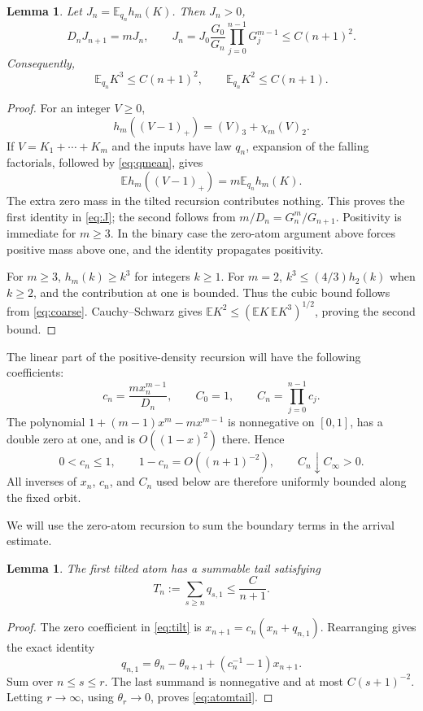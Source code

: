 \documentclass[11pt,letterpaper,reqno]{amsart}
\theoremstyle{plain}
\newtheorem{lemma}[theorem]{Lemma}
\newcommand{\E}{\mathbb E}\newcommand{\Pp}{\mathbb P}
\begin{document}
\begin{lemma}\label{lem:cubic}
Let $J_n=\E_{q_n}h_m(K)$. Then $J_n>0$,
\begin{equation}\label{eq:J}
 D_nJ_{n+1}=mJ_n,\qquad
 J_n=J_0\frac{G_0}{G_n}\prod_{j=0}^{n-1}G_j^{m-1}\le C(n+1)^2.
\end{equation}
Consequently,
\begin{equation}\label{eq:lowmoments}
 \E_{q_n}K^3\le C(n+1)^2,\qquad
 \E_{q_n}K^2\le C(n+1).
\end{equation}
\end{lemma}
\begin{proof}
For an integer $V\ge0$,
\[
 h_m((V-1)_+)=(V)_3+\chi_m(V)_2.
\]
If $V=K_1+\cdots+K_m$ and the inputs have law $q_n$, expansion of the falling factorials, followed by \eqref{eq:qmean}, gives
\[
 \E h_m((V-1)_+)=m\E_{q_n}h_m(K).
\]
The extra zero mass in the tilted recursion contributes nothing. This proves the first identity in \eqref{eq:J}; the second follows from $m/D_n=G_n^m/G_{n+1}$. Positivity is immediate for $m\ge3$. In the binary case the zero-atom argument above forces positive mass above one, and the identity propagates positivity.

For $m\ge3$, $h_m(k)\ge k^3$ for integers $k\ge1$. For $m=2$, $k^3\le(4/3)h_2(k)$ when $k\ge2$, and the contribution at one is bounded. Thus the cubic bound follows from \eqref{eq:coarse}. Cauchy--Schwarz gives $\E K^2\le(\E K\,\E K^3)^{1/2}$, proving the second bound.
\end{proof}

The linear part of the positive-density recursion will have the following coefficients:
\begin{equation}\label{eq:c}
 c_n=\frac{mx_n^{m-1}}{D_n},\qquad C_0=1,\qquad C_n=\prod_{j=0}^{n-1}c_j.
\end{equation}
The polynomial $1+(m-1)x^m-mx^{m-1}$ is nonnegative on $[0,1]$, has a double zero at one, and is $O((1-x)^2)$ there. Hence
\begin{equation}\label{eq:C}
 0<c_n\le1,\qquad 1-c_n=O((n+1)^{-2}),\qquad
 C_n\downarrow C_\infty>0.
\end{equation}
All inverses of $x_n$, $c_n$, and $C_n$ used below are therefore uniformly bounded along the fixed orbit.

We will use the zero-atom recursion to sum the boundary terms in the arrival estimate.
\begin{lemma}\label{lem:atomtail}
The first tilted atom has a summable tail satisfying
\begin{equation}\label{eq:atomtail}
 T_n:=\sum_{s\ge n}q_{s,1}\le\frac C{n+1}.
\end{equation}
\end{lemma}
\begin{proof}
The zero coefficient in \eqref{eq:tilt} is $x_{n+1}=c_n(x_n+q_{n,1})$. Rearranging gives the exact identity
\begin{equation}\label{eq:atomidentity}
 q_{n,1}=\theta_n-\theta_{n+1}+(c_n^{-1}-1)x_{n+1}.
\end{equation}
Sum over $n\le s\le r$. The last summand is nonnegative and at most $C(s+1)^{-2}$. Letting $r\to\infty$, using $\theta_r\to0$, proves \eqref{eq:atomtail}.
\end{proof}
\end{document}
